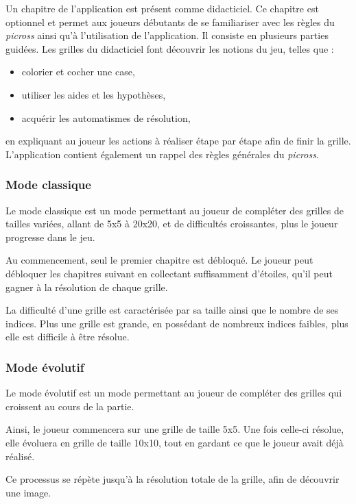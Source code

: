 \documentclass[a4paper, 12pt]{report}
\begin{document}
		    Un chapitre de l'application est présent comme didacticiel. Ce chapitre est optionnel et permet aux joueurs   débutants de se familiariser avec les règles du \textit{picross} ainsi qu'à l'utilisation de l'application. Il consiste en plusieurs parties guidées. Les grilles du didacticiel font découvrir les notions du jeu, telles que :
		    \begin{itemize}
            	\item colorier et cocher une case,
            	\item utiliser les aides et les hypothèses,
            	\item acquérir les automatismes de résolution,
        	\end{itemize}
		    en expliquant au joueur les actions à réaliser étape par étape afin de finir la grille. L'application contient également un rappel des règles générales du \textit{picross}.
		    
		\subsubsection{Mode classique}
		
		    Le mode classique est un mode permettant au joueur de compléter des grilles de tailles variées, allant de 5x5 à 20x20, et de difficultés croissantes, plus le joueur progresse dans le jeu.
		    
		    Au commencement, seul le premier chapitre est débloqué. Le joueur peut débloquer les chapitres suivant en collectant suffisamment d'étoiles, qu'il peut gagner à la résolution de chaque grille.
		    
		    La difficulté d'une grille est caractérisée par sa taille ainsi que le nombre de ses indices. Plus une grille est grande, en possédant de nombreux indices faibles, plus elle est difficile à être résolue.
		    
		\subsubsection{Mode évolutif}
		
		    Le mode évolutif est un mode permettant au joueur de compléter des grilles qui croissent au cours de la partie.
		    
		    Ainsi, le joueur commencera sur une grille de taille 5x5. Une fois celle-ci résolue, elle évoluera en grille de taille 10x10, tout en gardant ce que le joueur avait déjà réalisé. 
		    
		    Ce processus se répète jusqu'à la résolution totale de la grille, afin de découvrir une image.
			
\end{document}
